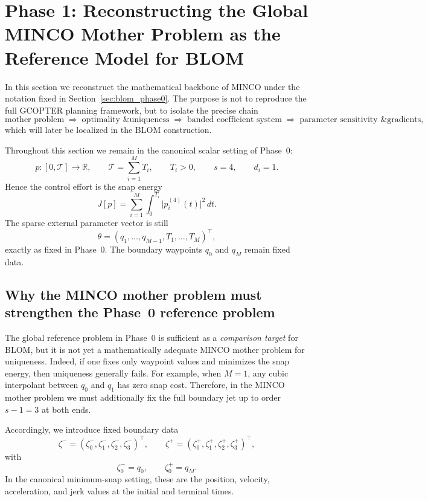 \section{Phase 1: Reconstructing the Global MINCO Mother Problem as the Reference Model for BLOM}
\label{sec:phase1_minco_reference}

In this section we reconstruct the mathematical backbone of MINCO under the notation fixed in
Section~\ref{sec:blom_phase0}. The purpose is not to reproduce the full GCOPTER planning
framework, but to isolate the precise chain
\[
  \text{mother problem}
  \;\Longrightarrow\;
  \text{optimality \& uniqueness}
  \;\Longrightarrow\;
  \text{banded coefficient system}
  \;\Longrightarrow\;
  \text{parameter sensitivity \& gradients},
\]
which will later be localized in the BLOM construction.

Throughout this section we remain in the canonical scalar setting of Phase~0:
\[
  p:[0,\mathcal T]\to \mathbb R,
  \qquad
  \mathcal T=\sum_{i=1}^{M}T_i,
  \qquad
  T_i>0,
  \qquad
  s=4,
  \qquad
  d_i=1.
\]
Hence the control effort is the snap energy
\[
  J[p]
  =
  \sum_{i=1}^{M}\int_{0}^{T_i}\bigl|p_i^{(4)}(t)\bigr|^2\,dt.
\]
The sparse external parameter vector is still
\begin{equation}
  \label{eq:phase1_theta}
  \theta=(q_1,\dots,q_{M-1},T_1,\dots,T_M)^\top,
\end{equation}
exactly as fixed in Phase~0. The boundary waypoints $q_0$ and $q_M$ remain fixed data.

\subsection{Why the MINCO mother problem must strengthen the Phase~0 reference problem}
\label{subsec:phase1_why_strengthen}

The global reference problem in Phase~0 is sufficient as a \emph{comparison target} for BLOM,
but it is not yet a mathematically adequate MINCO mother problem for uniqueness. Indeed, if
one fixes only waypoint values and minimizes the snap energy, then uniqueness generally fails.
For example, when $M=1$, any cubic interpolant between $q_0$ and $q_1$ has zero snap cost.
Therefore, in the MINCO mother problem we must additionally fix the full boundary jet up to
order $s-1=3$ at both ends.

Accordingly, we introduce fixed boundary data
\begin{equation}
  \label{eq:phase1_boundary_jets}
  \zeta^-=(\zeta^-_0,\zeta^-_1,\zeta^-_2,\zeta^-_3)^\top,
  \qquad
  \zeta^+=(\zeta^+_0,\zeta^+_1,\zeta^+_2,\zeta^+_3)^\top,
\end{equation}
with
\[
  \zeta^-_0=q_0,
  \qquad
  \zeta^+_0=q_M.
\]
In the canonical minimum-snap setting, these are the position, velocity, acceleration, and jerk
values at the initial and terminal times.

